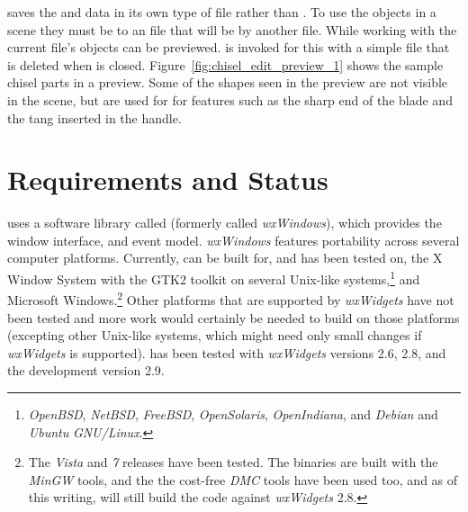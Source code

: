 \IXpkgu{} saves the \IXprism{} and \IXlathe{} data in its own type
of file rather than \IXpov{} .
To use the objects in a \IXpov{} scene they
must be  to an  file that will be
 by another  file. While
working with \IXpkg{} the current file's objects can
be previewed. \IXpov{} is invoked for this with a simple
 file that is deleted when \IXpov{} is closed.
Figure~\ref{fig:chisel_edit_preview_1}
shows the sample chisel parts in a \IXpov{} preview. Some
of the shapes seen in the preview are not visible in
the scene, but are used for
 for features
such as the sharp end of the blade and the tang inserted
in the handle.


\section{Requirements and Status}%
	\label{sec:requirement_status}

\IXpkgu{} uses a software library called 
(formerly called \emph{wxWindows}), which provides the window
interface, and event model. \emph{wxWindows} features
portability across several computer platforms. Currently,
\IXpkg{} can be built for, and has been tested on, the
X Window System with the GTK2 toolkit on several
Unix-like systems,\footnote{
\emph{OpenBSD}, \emph{NetBSD}, \emph{FreeBSD},
\emph{OpenSolaris}, \emph{OpenIndiana}, and
\emph{Debian} and \emph{Ubuntu} \emph{GNU/Linux}.
}
and Microsoft Windows.\footnote{
The \emph{Vista} and \emph{7} releases have been tested.
The binaries are built with the \emph{MinGW} tools, and
the the cost-free \emph{DMC} tools have been used too,
and as of this writing, will still build the code against
\emph{wxWidgets} 2.8.
}
Other platforms that are supported by \emph{wxWidgets} have
not been tested and
more work would certainly be needed to
build \IXpkg{} on those platforms
(excepting other Unix-like systems, which might
need only small changes if \emph{wxWidgets} is supported).
\IXpkgu{} has been
tested with \emph{wxWidgets} versions 2.6, 2.8, and the
development version 2.9.

